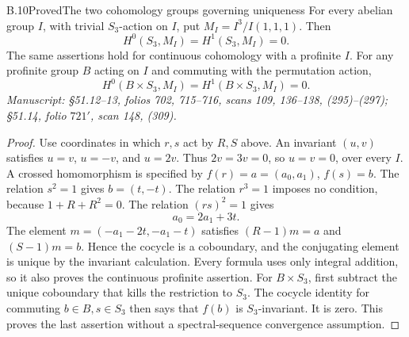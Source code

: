 \begin{statement}{B.10}{Proved}{The two cohomology groups governing uniqueness}
For every abelian group \(I\), with trivial \(S_3\)-action on \(I\),
put \(M_I=I^3/I(1,1,1)\). Then
\[
 H^0(S_3,M_I)=H^1(S_3,M_I)=0.                               \tag{B.7}
\]
The same assertions hold for continuous cohomology with a profinite
\(I\). For any profinite group \(B\) acting on \(I\) and commuting
with the permutation action,
\[
 H^0(B\times S_3,M_I)=H^1(B\times S_3,M_I)=0.
\]
\emph{Manuscript: \S51.12--13, folios 702, 715--716, scans 109,
136--138, (295)--(297); \S51.14, folio \(721'\), scan 148, (309).}
\end{statement}
\begin{proof}
Use coordinates in which \(r,s\) act by \(R,S\) above.
An invariant \((u,v)\) satisfies \(u=v\), \(u=-v\), and
\(u=2v\). Thus \(2v=3v=0\), so \(u=v=0\), over every \(I\).
A crossed homomorphism is specified by \(f(r)=a=(a_0,a_1)\),
\(f(s)=b\). The relation \(s^2=1\) gives \(b=(t,-t)\).
The relation \(r^3=1\) imposes no condition, because \(1+R+R^2=0\).
The relation \((rs)^2=1\) gives
\[
 a_0=2a_1+3t.
\]
The element \(m=(-a_1-2t,-a_1-t)\) satisfies
\((R-1)m=a\) and \((S-1)m=b\).
Hence the cocycle is a coboundary, and the conjugating element is
unique by the invariant calculation. Every formula uses only integral
addition, so it also proves the continuous profinite assertion.
For \(B\times S_3\), first subtract the unique coboundary that kills
the restriction to \(S_3\). The cocycle identity for commuting
\(b\in B,s\in S_3\) then says that \(f(b)\) is \(S_3\)-invariant.
It is zero. This proves the last assertion without a spectral-sequence
convergence assumption.
\end{proof}

